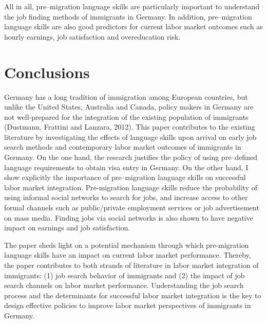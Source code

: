 \documentclass[12pt,a4paper]{article}
\begin{document}
All in all, pre--migration language skills are particularly important to understand the job finding methods of immigrants in Germany. In addition, pre--migration language skills are also good predictors for current labor market outcomes such as hourly earnings, job satisfaction and overeducation risk.







\section{Conclusions}

Germany has a long tradition of immigration among European countries, but unlike the United States, Australia and Canada, policy makers in Germany are not well-prepared for the integration of the existing population of immigrants (Dustmann, Frattini and Lanzara, 2012). This paper contributes to the existing literature by investigating the effects of language skills upon arrival on early job search methods and contemporary labor market outcomes of immigrants in Germany. On the one hand, the research justifies the policy of using pre--defined language requirements to obtain visa entry in Germany. On the other hand, I show explicitly the importance of pre--migration language skills on successful labor market integration. Pre-migration language skills reduce the probability of using informal social networks to search for jobs, and increase access to other formal channels such as public/private employment services or job advertisement on mass media. Finding jobs via social networks is also shown to have negative impact on earnings and job satisfaction.

The paper sheds light on a potential mechanism through which pre-migration language skills have an impact on current labor market performance. Thereby, the paper contributes to both strands of literature in labor market integration of immigrants: (1) job search behavior of immigrants and (2) the impact of job search channels on labor market performance. Understanding the job search process and the determinants for successful labor market integration is the key to design effective policies to improve labor market perspectives of immigrants in Germany.
\end{document}
